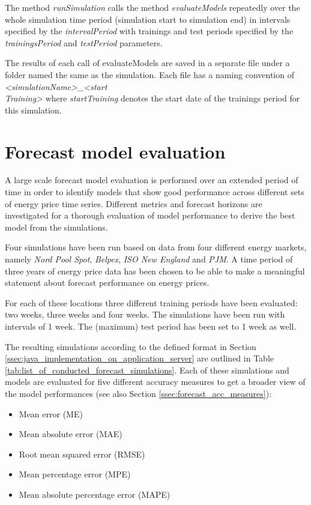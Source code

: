 The method \textit{runSimulation} calls the method \textit{evaluateModels} repeatedly over the whole simulation time period (simulation start to simulation end) in intervals specified by the \textit{intervalPeriod} with trainings and test periods specified by the \textit{trainingsPeriod} and \textit{testPeriod} parameters. 

The results of each call of evaluateModels are saved in a separate file under a folder named the same as the simulation. Each file has a naming convention of \textit{<simulationName>\_<start\\Training>} where \textit{startTraining} denotes the start date of the trainings period for this simulation. 



\section{Forecast model evaluation} \label{sec:forecast_model_evaluation}

A large scale forecast model evaluation is performed over an extended period of time in order to identify models that show good performance across different sets of energy price time series. Different metrics and forecast horizons are investigated for a thorough evaluation of model performance to derive the best model from the simulations. 

Four simulations have been run based on data from four different energy markets, namely \textit{Nord Pool Spot}, \textit{Belpex}, \textit{ISO New England} and \textit{PJM}. A time period of three years of energy price data has been chosen to be able to make a meaningful statement about forecast performance on energy prices. 

For each of these locations three different training periods have been evaluated: two weeks, three weeks and four weeks. The simulations have been run with intervals of 1 week. The (maximum) test period has been set to 1 week as well. 

The resulting simulations according to the defined format in Section \ref{ssec:java_implementation_on_application_server} are outlined in Table \ref{tab:list_of_conducted_forecast_simulations}. Each of these simulations and models are evaluated for five different accuracy measures to get a broader view of the model performances (see also Section \ref{ssec:forecast_acc_measures}): 

\begin{itemize}
	\item Mean error (ME)
	\item Mean absolute error (MAE)
	\item Root mean squared error (RMSE)
	\item Mean percentage error (MPE)
	\item Mean absolute percentage error (MAPE)
\end{itemize}

